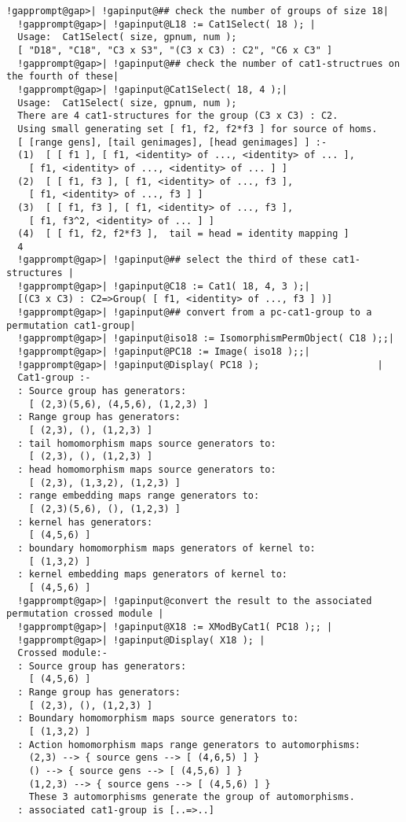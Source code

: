 \documentclass[a4paper,11pt]{report}
\begin{document}
{{\begin{Verbatim}[commandchars=!@|,fontsize=\small,frame=single,label=Example]
  !gapprompt@gap>| !gapinput@## check the number of groups of size 18|
  !gapprompt@gap>| !gapinput@L18 := Cat1Select( 18 ); |
  Usage:  Cat1Select( size, gpnum, num );
  [ "D18", "C18", "C3 x S3", "(C3 x C3) : C2", "C6 x C3" ]
  !gapprompt@gap>| !gapinput@## check the number of cat1-structrues on the fourth of these|
  !gapprompt@gap>| !gapinput@Cat1Select( 18, 4 );|
  Usage:  Cat1Select( size, gpnum, num );
  There are 4 cat1-structures for the group (C3 x C3) : C2.
  Using small generating set [ f1, f2, f2*f3 ] for source of homs.
  [ [range gens], [tail genimages], [head genimages] ] :-
  (1)  [ [ f1 ], [ f1, <identity> of ..., <identity> of ... ], 
    [ f1, <identity> of ..., <identity> of ... ] ]
  (2)  [ [ f1, f3 ], [ f1, <identity> of ..., f3 ], 
    [ f1, <identity> of ..., f3 ] ]
  (3)  [ [ f1, f3 ], [ f1, <identity> of ..., f3 ], 
    [ f1, f3^2, <identity> of ... ] ]
  (4)  [ [ f1, f2, f2*f3 ],  tail = head = identity mapping ]
  4
  !gapprompt@gap>| !gapinput@## select the third of these cat1-structures |
  !gapprompt@gap>| !gapinput@C18 := Cat1( 18, 4, 3 );|
  [(C3 x C3) : C2=>Group( [ f1, <identity> of ..., f3 ] )]
  !gapprompt@gap>| !gapinput@## convert from a pc-cat1-group to a permutation cat1-group|
  !gapprompt@gap>| !gapinput@iso18 := IsomorphismPermObject( C18 );;|
  !gapprompt@gap>| !gapinput@PC18 := Image( iso18 );;|
  !gapprompt@gap>| !gapinput@Display( PC18 );                     |
  Cat1-group :- 
  : Source group has generators:
    [ (2,3)(5,6), (4,5,6), (1,2,3) ]
  : Range group has generators:
    [ (2,3), (), (1,2,3) ]
  : tail homomorphism maps source generators to:
    [ (2,3), (), (1,2,3) ]
  : head homomorphism maps source generators to:
    [ (2,3), (1,3,2), (1,2,3) ]
  : range embedding maps range generators to:
    [ (2,3)(5,6), (), (1,2,3) ]
  : kernel has generators:
    [ (4,5,6) ]
  : boundary homomorphism maps generators of kernel to:
    [ (1,3,2) ]
  : kernel embedding maps generators of kernel to:
    [ (4,5,6) ]
  !gapprompt@gap>| !gapinput@convert the result to the associated permutation crossed module |
  !gapprompt@gap>| !gapinput@X18 := XModByCat1( PC18 );; |
  !gapprompt@gap>| !gapinput@Display( X18 ); |
  Crossed module:- 
  : Source group has generators:
    [ (4,5,6) ]
  : Range group has generators:
    [ (2,3), (), (1,2,3) ]
  : Boundary homomorphism maps source generators to:
    [ (1,3,2) ]
  : Action homomorphism maps range generators to automorphisms:
    (2,3) --> { source gens --> [ (4,6,5) ] }
    () --> { source gens --> [ (4,5,6) ] }
    (1,2,3) --> { source gens --> [ (4,5,6) ] }
    These 3 automorphisms generate the group of automorphisms.
  : associated cat1-group is [..=>..]
  

\end{Verbatim}}}
\end{document}
